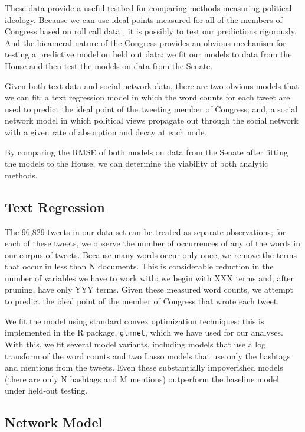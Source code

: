 \documentclass[10pt]{article}
\begin{document}
These data provide a useful testbed for comparing methods measuring political ideology. Because we can use ideal points measured for all of the members of Congress based on roll call data \citep{Jackman_2001}, it is possibly to test our predictions rigorously. And the bicameral nature of the Congress provides an obvious mechanism for testing a predictive model on held out data: we fit our models to data from the House and then test the models on data from the Senate.

Given both text data and social network data, there are two obvious models that we can fit: a text regression model in which the word counts for each tweet are used to predict the ideal point of the tweeting member of Congress; and, a social network model in which political views propagate out through the social network with a given rate of absorption and decay at each node.

By comparing the RMSE of both models on data from the Senate after fitting the models to the House, we can determine the viability of both analytic methods.

\subsection{Text Regression}
The 96,829 tweets in our data set can be treated as separate observations; for each of these tweets, we observe the number of occurrences of any of the words in our corpus of tweets. Because many words occur only once, we remove the terms that occur in less than N documents. This is considerable reduction in the number of variables we have to work with: we begin with XXX terms and, after pruning, have only YYY terms. Given these measured word counts, we attempt to predict the ideal point of the member of Congress that wrote each tweet.

We fit the model using standard convex optimization techniques: this is implemented in the R package, \texttt{glmnet}, which we have used for our analyses.  With this, we fit several model variants, including models that use a log transform of the word counts and two Lasso models that use only the hashtags and mentions from the tweets. Even these substantially impoverished models (there are only N hashtags and M mentions) outperform the baseline model under held-out testing.

\subsection{Network Model} %
\end{document}
